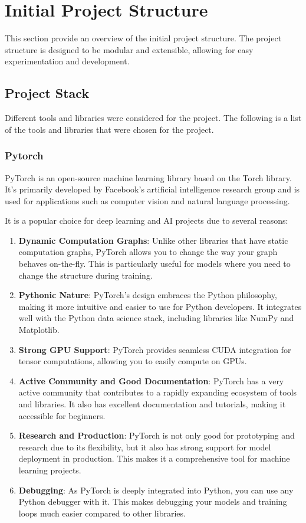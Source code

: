 \section{Initial Project Structure}
This section provide an overview of the initial project structure. The project structure is designed to be modular and extensible, allowing for easy experimentation and development.

\subsection{Project Stack}
Different tools and libraries were considered for the project. The following is a list of the tools and libraries that were chosen for the project.

\subsubsection{Pytorch}
PyTorch is an open-source machine learning library based on the Torch library. It's primarily developed by Facebook's artificial intelligence research group and is used for applications such as computer vision and natural language processing.

It is a popular choice for deep learning and AI projects due to several reasons:
\begin{enumerate}
    \item \textbf{Dynamic Computation Graphs}: Unlike other libraries that have static computation graphs, PyTorch allows you to change the way your graph behaves on-the-fly. This is particularly useful for models where you need to change the structure during training.
    \item \textbf{Pythonic Nature}: PyTorch's design embraces the Python philosophy, making it more intuitive and easier to use for Python developers. It integrates well with the Python data science stack, including libraries like NumPy and Matplotlib.
    \item \textbf{Strong GPU Support}: PyTorch provides seamless CUDA integration for tensor computations, allowing you to easily compute on GPUs.
    \item \textbf{Active Community and Good Documentation}: PyTorch has a very active community that contributes to a rapidly expanding ecosystem of tools and libraries. It also has excellent documentation and tutorials, making it accessible for beginners.
    \item \textbf{Research and Production}: PyTorch is not only good for prototyping and research due to its flexibility, but it also has strong support for model deployment in production. This makes it a comprehensive tool for machine learning projects.
    \item \textbf{Debugging}: As PyTorch is deeply integrated into Python, you can use any Python debugger with it. This makes debugging your models and training loops much easier compared to other libraries.
\end{enumerate}

